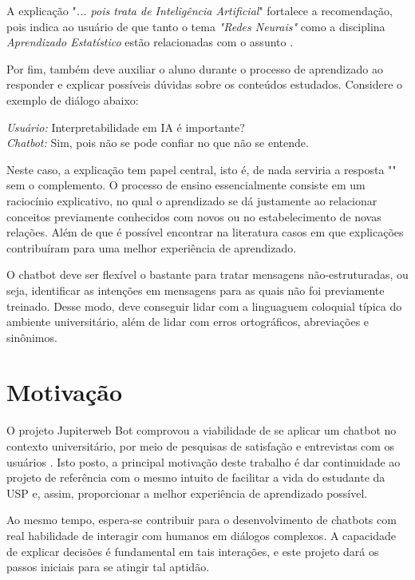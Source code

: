 \documentclass[]{politex}
\begin{document}
A explicação "\textit{... pois trata de Inteligência Artificial}" fortalece a recomendação, pois indica ao usuário de que tanto o tema \textit{"Redes Neurais"} como a disciplina \textit{Aprendizado Estatístico} estão relacionadas com o assunto .

Por fim, também deve auxiliar o aluno durante o processo de aprendizado ao responder e explicar possíveis dúvidas sobre os conteúdos estudados. Considere o exemplo de diálogo abaixo:

\begin{flushleft}
    \textit{Usuário:} Interpretabilidade em IA é importante? \\
    \textit{Chatbot:} Sim, pois não se pode confiar no que não se entende.
\end{flushleft}

Neste caso, a explicação tem papel central, isto é, de nada serviria a resposta "" sem o complemento. O processo de ensino essencialmente consiste em um raciocínio explicativo, no qual o aprendizado se dá justamente ao relacionar conceitos previamente conhecidos com novos ou no estabelecimento de novas relações. Além de que é possível encontrar na literatura casos em que explicações contribuíram para uma melhor experiência de aprendizado. \cite{DBLP:conf/iui/PutnamC19}

O chatbot deve ser flexível o bastante para tratar mensagens não-estruturadas, ou seja, identificar as intenções em mensagens para as quais não foi previamente treinado. Desse modo, deve conseguir lidar com a linguaguem coloquial típica do ambiente universitário, além de lidar com erros ortográficos, abreviações e sinônimos.

\section{Motivação}

O projeto Jupiterweb Bot comprovou a viabilidade de se aplicar um chatbot no contexto universitário, por meio de pesquisas de satisfação e entrevistas com os usuários \cite{Correa-et-al-2018}. Isto posto, a principal motivação deste trabalho é dar continuidade ao projeto de referência com o mesmo intuito de facilitar a vida do estudante da USP e, assim, proporcionar a melhor experiência de aprendizado possível. 

Ao mesmo tempo, espera-se contribuir para o desenvolvimento de chatbots com real habilidade de interagir com humanos em diálogos complexos. A capacidade de explicar decisões é fundamental em tais interações, e este projeto dará os passos iniciais para se atingir tal aptidão.
\end{document}
